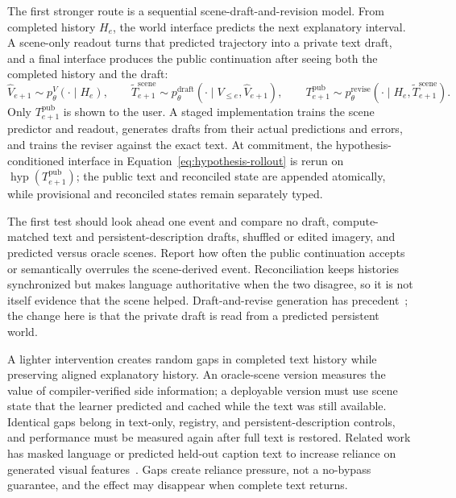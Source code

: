 \documentclass[11pt]{article}
\begin{document}
The first stronger route is a sequential scene-draft-and-revision model. From completed history $H_e$, the world interface predicts the next explanatory interval. A scene-only readout turns that predicted trajectory into a private text draft, and a final interface produces the public continuation after seeing both the completed history and the draft:
\begin{equation}
  \widehat V_{e+1}\sim p_\theta^V(\cdot\mid H_e),\qquad
  \widetilde T^{\mathrm{scene}}_{e+1}\sim p_\theta^{\mathrm{draft}}(\cdot\mid V_{\le e},\widehat V_{e+1}),\qquad
  T^{\mathrm{pub}}_{e+1}\sim p_\theta^{\mathrm{revise}}(\cdot\mid H_e,\widetilde T^{\mathrm{scene}}_{e+1}).
  \label{eq:scene-draft}
\end{equation}
Only $T^{\mathrm{pub}}_{e+1}$ is shown to the user. A staged implementation trains the scene predictor and readout, generates drafts from their actual predictions and errors, and trains the reviser against the exact text. At commitment, the hypothesis-conditioned interface in Equation~\ref{eq:hypothesis-rollout} is rerun on $\operatorname{hyp}(T^{\mathrm{pub}}_{e+1})$; the public text and reconciled state are appended atomically, while provisional and reconciled states remain separately typed.

The first test should look ahead one event and compare no draft, compute-matched text and persistent-description drafts, shuffled or edited imagery, and predicted versus oracle scenes. Report how often the public continuation accepts or semantically overrules the scene-derived event. Reconciliation keeps histories synchronized but makes language authoritative when the two disagree, so it is not itself evidence that the scene helped. Draft-and-revise generation has precedent~\cite{xia2017deliberation}; the change here is that the private draft is read from a predicted persistent world.

A lighter intervention creates random gaps in completed text history while preserving aligned explanatory history. An oracle-scene version measures the value of compiler-verified side information; a deployable version must use scene state that the learner predicted and cached while the text was still available. Identical gaps belong in text-only, registry, and persistent-description controls, and performance must be measured again after full text is restored. Related work has masked language or predicted held-out caption text to increase reliance on generated visual features~\cite{tang2023learning}. Gaps create reliance pressure, not a no-bypass guarantee, and the effect may disappear when complete text returns.
\end{document}
